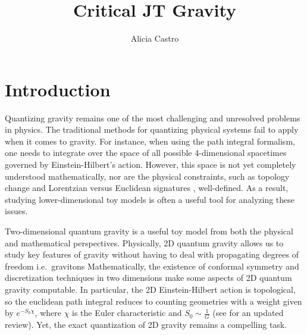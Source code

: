 \documentclass[a4paper,11pt]{article}
\title{\boldmath Critical JT Gravity}
\author{Alicia Castro}
\affiliation{IMAPP, Radboud University,\\
6525 AJ Nijmegen, Netherlands}
\begin{document}
\maketitle
\flushbottom

\section{Introduction}

Quantizing gravity remains one of the most challenging and unresolved problems in physics. The traditional methods for quantizing physical systems fail to apply when it comes to gravity. For instance, when using the path integral formalism, one needs to integrate over the space of all possible 4-dimensional spacetimes governed by Einstein-Hilbert's action. However, this space is not yet completely understood mathematically, nor are the physical constraints, such as topology change and Lorentzian versus Euclidean signatures \cite{Ambjorn:1998fd}, well-defined.  As a result, studying lower-dimensional toy models is often a useful tool for analyzing these issues.

Two-dimensional quantum gravity is a useful toy model from both the physical and mathematical perspectives. Physically, 2D quantum gravity allows us to study key features of gravity without having to deal with propagating degrees of freedom i.e.\ gravitons  Mathematically, the existence of conformal symmetry and discretization techniques in two dimensions make some aspects of 2D quantum gravity computable. In particular, the 2D Einstein-Hilbert action is topological, so the euclidean path integral reduces to counting geometries with a weight given by $e^{-S_0\chi}$, where $\chi$ is the Euler characteristic and $S_0\sim\frac{1}{G}$ (see \cite{Budd:2022zry} for an updated review). Yet, the exact quantization of 2D gravity remains a compelling task.
\end{document}
